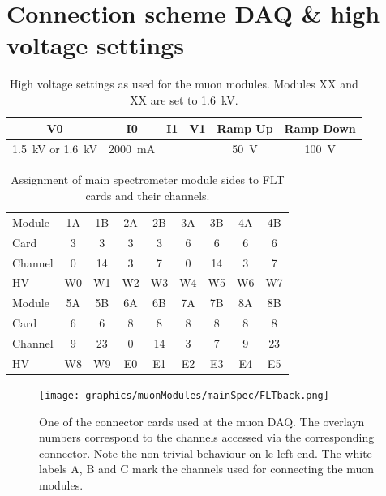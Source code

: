 \clearpage
\section{Connection scheme DAQ \& high voltage settings}

    \begin{table}[h]
  \centering
  	\begin{tabular}{|c|c|c|c|c|c|}
  	\hline
  		V0 & I0 & I1 & V1 & Ramp Up & Ramp Down\\
  		\hline
  		\SI{1.5}{\kilo\volt} or \SI{1.6}{\kilo\volt} & \SI{2000}{\milli\ampere} & & & \SI{50}{\volt} & \SI{100}{\volt}\\
  		\hline
  	\end{tabular}
  	\caption[High voltage settings]{High voltage settings as used for the muon modules. Modules XX and XX are set to \SI{1.6}{\kilo\volt}.}
  	\label{tab:HVSettings}
  \end{table}
\begin{table}[h]
  	\centering
  	\begin{tabular}{| l | c c | c c | c c | c c |}
  	\hline
  		Module	& 1A	& 1B	& 2A	& 2B	& 3A	& 3B	& 4A	& 4B 	\\
  		Card	& 3	& 3	& 3	& 3	& 6	& 6	& 6	& 6	\\
  		Channel	& 0	& 14	& 3	& 7	& 0	& 14	& 3	& 7	\\
  		HV		& W0 & W1 & W2 & W3 & W4 & W5 & W6 & W7 \\
  		\hline \hline
  		Module	&5A	& 5B	& 6A	& 6B	& 7A	& 7B	& 8A	& 8B	\\
  		Card	& 6	& 6	& 8	& 8	& 8	& 8	& 8	& 8	\\
  		Channel	& 9	& 23	& 0	& 14	& 3	& 7	& 9	& 23	\\
  		HV		& W8 & W9 & E0 & E1 & E2 & E3 & E4 & E5\\
  		\hline
  	\end{tabular}
  	
  	\caption[Main spectrometer DAQ channel assignment]{Assignment of main spectrometer module sides to FLT cards and their channels.}
  	\label{tab:connectionsModulesCards}
  \end{table}
  \begin{figure}[H]
	\centering
  	\texttt{[image: graphics/muonModules/mainSpec/FLTback.png]}
  	\caption[FLT connector card]{One of the connector cards used at the muon DAQ. The overlayn numbers correspond to the channels accessed via the corresponding connector. Note the non trivial behaviour on le left end. The white labels A, B and C mark the channels used for connecting the muon modules.}
  	\label{fig:FLTback}
  \end{figure}
  

